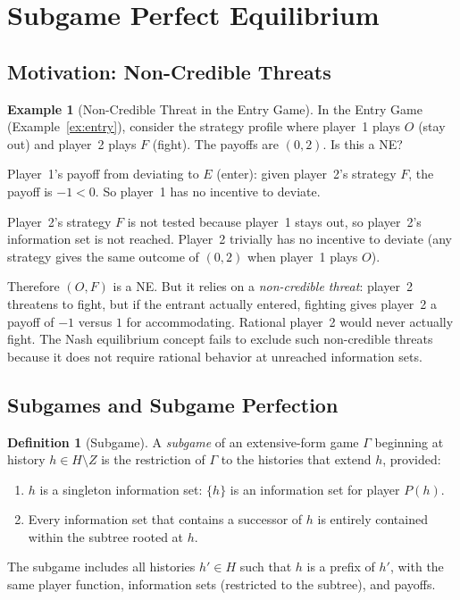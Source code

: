 \documentclass[11pt,a4paper]{article}
\theoremstyle{definition}
\newtheorem{definition}{Definition}[section]
\newtheorem{example}{Example}[section]
\theoremstyle{plain}
\theoremstyle{remark}
\begin{document}
\section{Subgame Perfect Equilibrium}
\label{sec:spe}

\subsection{Motivation: Non-Credible Threats}
\label{subsec:noncredible}

\begin{example}[Non-Credible Threat in the Entry Game]
\label{ex:noncredible}
In the Entry Game (Example~\ref{ex:entry}), consider the strategy profile where
player~1 plays $O$ (stay out) and player~2 plays $F$ (fight). The payoffs are
$(0, 2)$. Is this a NE?

Player~1's payoff from deviating to $E$ (enter): given player~2's strategy $F$,
the payoff is $-1 < 0$. So player~1 has no incentive to deviate.

Player~2's strategy $F$ is not tested because player~1 stays out, so player~2's
information set is not reached. Player~2 trivially has no incentive to deviate
(any strategy gives the same outcome of $(0,2)$ when player~1 plays $O$).

Therefore $(O, F)$ is a NE. But it relies on a \emph{non-credible threat}:
player~2 threatens to fight, but if the entrant actually entered, fighting
gives player~2 a payoff of $-1$ versus $1$ for accommodating. Rational player~2
would never actually fight. The Nash equilibrium concept fails to exclude such
non-credible threats because it does not require rational behavior at unreached
information sets.
\end{example}

\subsection{Subgames and Subgame Perfection}
\label{subsec:subgame_def}

\begin{definition}[Subgame]
\label{def:subgame}
A \emph{subgame} of an extensive-form game $\Gamma$ beginning at history $h \in H \setminus Z$
is the restriction of $\Gamma$ to the histories that extend $h$, provided:
\begin{enumerate}[nosep,label=(\roman*)]
    \item $h$ is a singleton information set: $\{h\}$ is an information set for
    player $P(h)$.
    \item Every information set that contains a successor of $h$ is entirely contained
    within the subtree rooted at $h$.
\end{enumerate}
The subgame includes all histories $h' \in H$ such that $h$ is a prefix of $h'$,
with the same player function, information sets (restricted to the subtree), and payoffs.
\end{definition}
\end{document}
